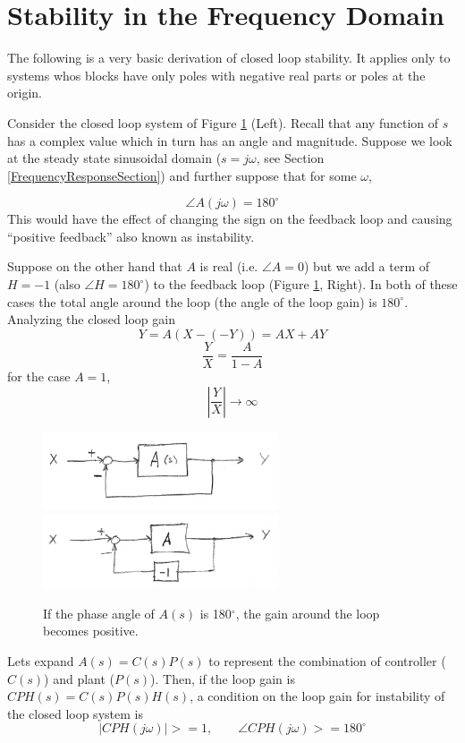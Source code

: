 \section{Stability in the Frequency Domain}



The following is a very basic derivation of closed loop stability.  It applies only to systems whos blocks have only poles with negative real parts or poles at the origin.

Consider the closed loop system of Figure \ref{NyquistLoop} (Left).  Recall that any function of $s$ has a complex value which in turn has an angle and magnitude.  Suppose we look at the steady state sinusoidal domain ($s=j\omega$, see Section \ref{FrequencyResponseSection}) and further suppose that for some $\omega$,

$$
\angle A(j\omega) = 180^\circ
$$
This would have the effect of changing the sign on the feedback loop and causing ``positive
 feedback'' also known as instability.


Suppose on the other hand that $A$ is real (i.e. $\angle A = 0$) but we add a term of $H=-1$
(also $\angle{H} = 180^\circ$) to the feedback loop (Figure \ref{NyquistLoop}, Right).
In both of these cases the total angle around the loop (the angle of the loop gain) is $180^\circ$.
Analyzing the closed loop gain
\[
Y = A(X-(-Y)) = AX + AY
\]
\[
\frac{Y}{X}  = \frac {A} {1-A}
\]
for the case $A=1$,
\[
|\frac{Y}{X}| \to \infty
\]


\begin{figure}\centering
\includegraphics[width=2.75in]{figs06/00792a.png}
\includegraphics[width=2.75in]{figs06/00793a.png}
\caption{If the phase angle of $A(s)$ is 180$^\circ$, the gain around the loop becomes positive.}\label{NyquistLoop}
\end{figure}

Lets expand $A(s) = C(s)P(s)$ to represent the combination of controller ($C(s)$) and
plant ($P(s)$). Then, if the loop gain is $CPH(s) = C(s)P(s)H(s)$,
a condition on the loop gain for instability of the closed loop system is
\[
\left | CPH(j\omega) \right | >= 1, \qquad \angle CPH(j\omega) >= 180^\circ
\]

